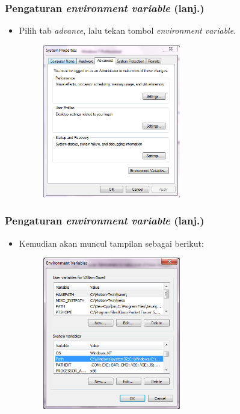 \documentclass{beamer}
\begin{document}
\begin{frame}
\frametitle{Pengaturan \textit{environment variable} (lanj.)}
\begin{itemize}
	\item Pilih tab \textit{advance}, lalu tekan tombol \textit{environment variable}.
	\begin{figure}
		\includegraphics[width=6cm]{asset/path_2.PNG}
	\end{figure}
\end{itemize}
\end{frame}

\begin{frame}
\frametitle{Pengaturan \textit{environment variable} (lanj.)}
\begin{itemize}
	\item Kemudian akan muncul tampilan sebagai berikut:
	\begin{figure}
		\includegraphics[width=6cm]{asset/path_3.PNG}
	\end{figure}
\end{itemize}
\end{frame}
\end{document}
